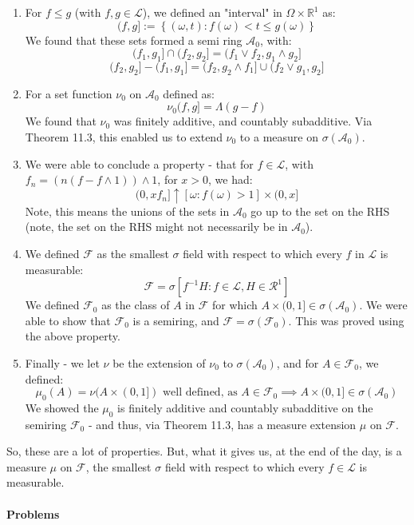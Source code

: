 \documentclass[12pt,a4paper]{article}
\newcommand{\1}[1]{\mathbbm{1}\left\{ #1 \right\}}
\newcommand{\R}{\mathbb{R}}
\newcommand{\acal}{\mathcal{A}}
\newcommand{\lcal}{\mathcal{L}}
\newcommand{\fcal}{\mathcal{F}}
\newcommand{\rcal}{\mathcal{R}}
\begin{document}
\begin{enumerate}
	\item For $f \leq g$ (with $f,g \in \lcal$), we defined an "interval" in $\Omega \times \R^1$ as:
	$$
		(f,g]:= \left\{(\omega, t) : f(\omega) < t \leq g(\omega)\right\}
	$$
	We found that these sets formed a semi ring $\acal_0$, with:
	$$
		(f_1,g_1] \cap (f_2,g_2] = (f_1 \vee f_2, g_1 \wedge g_2]
	$$
	$$
		(f_2,g_2] - (f_1,g_1] = (f_2, g_2 \wedge f_1] \cup (f_2 \vee g_1, g_2]
	$$
	
	\item For a set function $\nu_0$ on $\acal_0$ defined as:
	$$
		\nu_0(f,g] = \Lambda(g - f)
	$$
	We found that $\nu_0$ was finitely additive, and countably subadditive. Via Theorem 11.3, this enabled us to extend $\nu_0$ to a measure on $\sigma(\acal_0)$.
	
	\item We were able to conclude a property - that for $f \in \lcal$, with $f_n = (n(f - f \wedge 1)) \wedge 1$, for $x > 0$, we had:
	$$
		(0, xf_n] \uparrow [\omega : f(\omega) > 1] \times (0,x]
	$$
	Note, this means the unions of the sets in $\acal_0$ go up to the set on the RHS (note, the set on the RHS might not necessarily be in $\acal_0$).
	
	\item We defined $\fcal$ as the smallest $\sigma$ field with respect to which every $f$ in $\lcal$ is measurable:
	$$
		\fcal = \sigma\left[f^{-1}H : f \in \lcal, H \in \rcal^1\right]
	$$
	We defined $\fcal_0$ as the class of $A$ in $\fcal$ for which $A \times (0,1] \in \sigma(\acal_0)$. We were able to show that $\fcal_0$ is a semiring, and $\fcal = \sigma(\fcal_0)$. This was proved using the above property.
	
	\item Finally - we let $\nu$ be the extension of $\nu_0$ to $\sigma(\acal_0)$, and for $A \in \fcal_0$, we defined:
	$$
		\mu_0(A) = \nu(A \times (0,1]) \text{ well defined, as $A \in \fcal_0 \implies A \times (0,1] \in \sigma(\acal_0)$}
	$$
	We showed the $\mu_0$ is finitely additive and countably subadditive on the semiring $\fcal_0$ - and thus, via Theorem 11.3, has a measure extension $\mu$ on $\fcal$.
\end{enumerate}

So, these are a lot of properties. But, what it gives us, at the end of the day, is a measure $\mu$ on $\fcal$, the smallest $\sigma$ field with respect to which every $f \in \lcal$ is measurable.

\paragraph{Problems}
\end{document}
